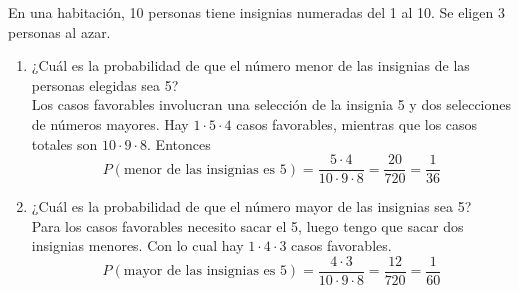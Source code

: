 \item En una habitación, 10 personas tiene insignias numeradas del 1 al 10. Se eligen 3 personas al azar.
    \begin{enumerate}
        \item ¿Cuál es la probabilidad de que el número menor de las insignias de las personas elegidas sea 5?\e\\
            Los casos favorables involucran una selección de la insignia 5 y dos selecciones de números mayores. Hay $1\cdot5\cdot4$ casos favorables, mientras que los casos totales son $10\cdot9\cdot8$. Entonces\[P(\text{menor de las insignias es 5})=\frac{5\cdot4}{10\cdot9\cdot8}=\frac{20}{720}=\frac{1}{36}\]
        \item ¿Cuál es la probabilidad de que el número mayor de las insignias sea 5?\e\\
            Para los casos favorables necesito sacar el 5, luego tengo que sacar dos insignias menores. Con lo cual hay $1\cdot4\cdot3$ casos favorables.\[P(\text{mayor de las insignias es 5})=\frac{4\cdot3}{10\cdot9\cdot8}=\frac{12}{720}=\frac{1}{60}\]
    \end{enumerate}